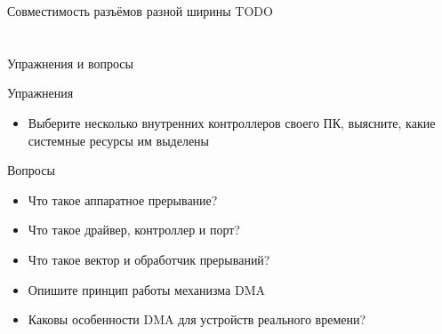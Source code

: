 \documentclass[xetex,aspectratio=43]{beamer}
\begin{document}
\begin{frame}{Совместимость разъёмов разной ширины}
	TODO
\end{frame}


\section*{}

\begin{frame}{Упражнения и вопросы}
	\begin{block}{Упражнения}
		\begin{itemize}
			\tightlist
			\item
			Выберите несколько внутренних контроллеров своего ПК, выясните, какие
			системные ресурсы им выделены
		\end{itemize}
	\end{block}
	
	\begin{block}{Вопросы}
		\begin{itemize}
			\tightlist
			\item
			Что такое аппаратное прерывание?
			\item
			Что такое драйвер, контроллер и порт?
			\item
			Что такое вектор и обработчик прерываний?
			\item
			Опишите принцип работы механизма DMA
			\item
			Каковы особенности DMA для устройств реального времени?
		\end{itemize}
	\end{block}
\end{frame}

\postamble
\end{document}
